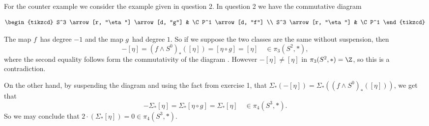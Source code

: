 \begin{exercise}[1 \& 2]
For the counter example we consider the example given in question 2. 
In question 2 we have the commutative diagram

\begin{equation}
\label{dgr:1}
\begin{tikzcd}
S^3 \arrow[r, "\eta"] \arrow[d, "g"] & \C P^1 \arrow[d, "f"] \\
S^3 \arrow[r, "\eta"] & \C P^1 
\end{tikzcd}
\end{equation}

The map $f$ has degree $-1$ and the map $g$ had degree $1$. So if we suppose 
the two classes are the same without suspension, then 
\[ -[\eta] = (f \wedge S^0)_* ([\eta]) = [ \eta \circ g ] = [\eta] \quad\in
\pi_3(S^2, *), \]
where the second equality follows form the commutativity of the diagram
. However $-[\eta] \ne [\eta]$ in $\pi_3(S^2, *) = \Z$, so this is a contradiction.

On the other hand, by suspending the diagram  and using the fact
from exercise 1, that $\Sigma_* (-[\eta]) = \Sigma_* ( (f \wedge S^0)_* ([\eta])
)$, we get that 
\[ -\Sigma_*[\eta] = \Sigma_* [ \eta \circ g ] = \Sigma_* [\eta]
\quad\in\pi_4(S^3,*). \]
So we may conclude that $2 \cdot (\Sigma_*[\eta]) = 0 \in \pi_4(S^3, *)$.


\end{exercise}


